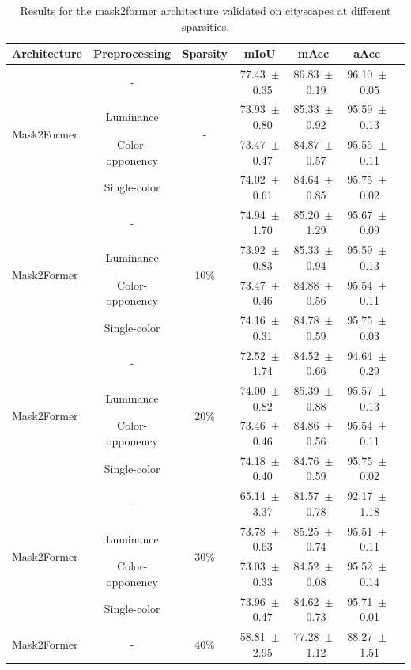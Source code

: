 \begin{table}[h]
\centering
\caption{Results for the mask2former architecture validated on cityscapes at different sparsities.}
\begin{tabular}{@{}lccc ccc@{}}
\toprule
Architecture & Preprocessing & Sparsity & mIoU & mAcc & aAcc \\
\midrule

\multirow{4}{*}{Mask2Former} & - & \multirow{4}{*}{-} & 77.43~$\pm$~0.35 & 86.83~$\pm$~0.19 & 96.10~$\pm$~0.05 \\
& Luminance & & 73.93~$\pm$~0.80 & 85.33~$\pm$~0.92 & 95.59~$\pm$~0.13 \\
& Color-opponency & & 73.47~$\pm$~0.47 & 84.87~$\pm$~0.57 & 95.55~$\pm$~0.11 \\
& Single-color & & 74.02~$\pm$~0.61 & 84.64~$\pm$~0.85 & 95.75~$\pm$~0.02 \\
\midrule
\multirow{4}{*}{Mask2Former} & - & \multirow{4}{*}{10\%} & 74.94~$\pm$~1.70 & 85.20~$\pm$~1.29 & 95.67~$\pm$~0.09 \\
& Luminance & & 73.92~$\pm$~0.83 & 85.33~$\pm$~0.94 & 95.59~$\pm$~0.13 \\
& Color-opponency & & 73.47~$\pm$~0.46 & 84.88~$\pm$~0.56 & 95.54~$\pm$~0.11 \\
& Single-color & & 74.16~$\pm$~0.31 & 84.78~$\pm$~0.59 & 95.75~$\pm$~0.03 \\
\midrule
\multirow{4}{*}{Mask2Former} & - & \multirow{4}{*}{20\%} & 72.52~$\pm$~1.74 & 84.52~$\pm$~0.66 & 94.64~$\pm$~0.29 \\
& Luminance & & 74.00~$\pm$~0.82 & 85.39~$\pm$~0.88 & 95.57~$\pm$~0.13 \\
& Color-opponency & & 73.46~$\pm$~0.46 & 84.86~$\pm$~0.56 & 95.54~$\pm$~0.11 \\
& Single-color & & 74.18~$\pm$~0.40 & 84.76~$\pm$~0.59 & 95.75~$\pm$~0.02 \\
\midrule
\multirow{4}{*}{Mask2Former} & - & \multirow{4}{*}{30\%} & 65.14~$\pm$~3.37 & 81.57~$\pm$~0.78 & 92.17~$\pm$~1.18 \\
& Luminance & & 73.78~$\pm$~0.63 & 85.25~$\pm$~0.74 & 95.51~$\pm$~0.11 \\
& Color-opponency & & 73.03~$\pm$~0.33 & 84.52~$\pm$~0.08 & 95.52~$\pm$~0.14 \\
& Single-color & & 73.96~$\pm$~0.47 & 84.62~$\pm$~0.73 & 95.71~$\pm$~0.01 \\
\midrule
\multirow{4}{*}{Mask2Former} & - & \multirow{4}{*}{40\%} & 58.81~$\pm$~2.95 & 77.28~$\pm$~1.12 & 88.27~$\pm$~1.51 \\

\end{tabular}
\end{table}
